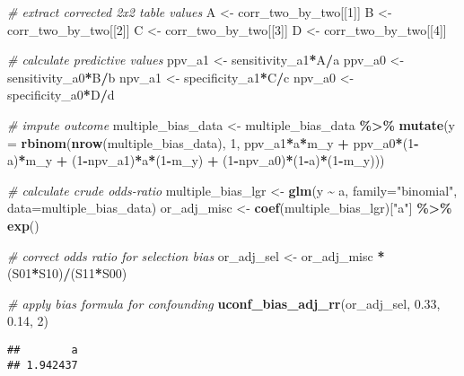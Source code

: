 \documentclass[
]{book}
\newenvironment{Shaded}{\begin{snugshade}}{\end{snugshade}}
\newcommand{\AttributeTok}[1]{\textcolor[rgb]{0.13,0.29,0.53}{#1}}
\newcommand{\CommentTok}[1]{\textcolor[rgb]{0.56,0.35,0.01}{\textit{#1}}}
\newcommand{\DecValTok}[1]{\textcolor[rgb]{0.00,0.00,0.81}{#1}}
\newcommand{\FloatTok}[1]{\textcolor[rgb]{0.00,0.00,0.81}{#1}}
\newcommand{\FunctionTok}[1]{\textcolor[rgb]{0.13,0.29,0.53}{\textbf{#1}}}
\newcommand{\NormalTok}[1]{#1}
\newcommand{\OtherTok}[1]{\textcolor[rgb]{0.56,0.35,0.01}{#1}}
\newcommand{\SpecialCharTok}[1]{\textcolor[rgb]{0.81,0.36,0.00}{\textbf{#1}}}
\newcommand{\StringTok}[1]{\textcolor[rgb]{0.31,0.60,0.02}{#1}}
\begin{document}
\begin{Shaded}
\begin{Highlighting}[]
\CommentTok{\# extract corrected 2x2 table values}
\NormalTok{A }\OtherTok{\textless{}{-}}\NormalTok{ corr\_two\_by\_two[[}\DecValTok{1}\NormalTok{]]}
\NormalTok{B }\OtherTok{\textless{}{-}}\NormalTok{ corr\_two\_by\_two[[}\DecValTok{2}\NormalTok{]]}
\NormalTok{C }\OtherTok{\textless{}{-}}\NormalTok{ corr\_two\_by\_two[[}\DecValTok{3}\NormalTok{]]}
\NormalTok{D }\OtherTok{\textless{}{-}}\NormalTok{ corr\_two\_by\_two[[}\DecValTok{4}\NormalTok{]]}

\CommentTok{\# calculate predictive values}
\NormalTok{ppv\_a1 }\OtherTok{\textless{}{-}}\NormalTok{ sensitivity\_a1}\SpecialCharTok{*}\NormalTok{A}\SpecialCharTok{/}\NormalTok{a}
\NormalTok{ppv\_a0 }\OtherTok{\textless{}{-}}\NormalTok{ sensitivity\_a0}\SpecialCharTok{*}\NormalTok{B}\SpecialCharTok{/}\NormalTok{b}
\NormalTok{npv\_a1 }\OtherTok{\textless{}{-}}\NormalTok{ specificity\_a1}\SpecialCharTok{*}\NormalTok{C}\SpecialCharTok{/}\NormalTok{c}
\NormalTok{npv\_a0 }\OtherTok{\textless{}{-}}\NormalTok{ specificity\_a0}\SpecialCharTok{*}\NormalTok{D}\SpecialCharTok{/}\NormalTok{d}

\CommentTok{\# impute outcome}
\NormalTok{multiple\_bias\_data }\OtherTok{\textless{}{-}}\NormalTok{ multiple\_bias\_data }\SpecialCharTok{\%\textgreater{}\%} \FunctionTok{mutate}\NormalTok{(}\AttributeTok{y =} \FunctionTok{rbinom}\NormalTok{(}\FunctionTok{nrow}\NormalTok{(multiple\_bias\_data), }\DecValTok{1}\NormalTok{, ppv\_a1}\SpecialCharTok{*}\NormalTok{a}\SpecialCharTok{*}\NormalTok{m\_y }\SpecialCharTok{+}\NormalTok{ ppv\_a0}\SpecialCharTok{*}\NormalTok{(}\DecValTok{1}\SpecialCharTok{{-}}\NormalTok{a)}\SpecialCharTok{*}\NormalTok{m\_y }\SpecialCharTok{+}\NormalTok{ (}\DecValTok{1}\SpecialCharTok{{-}}\NormalTok{npv\_a1)}\SpecialCharTok{*}\NormalTok{a}\SpecialCharTok{*}\NormalTok{(}\DecValTok{1}\SpecialCharTok{{-}}\NormalTok{m\_y) }\SpecialCharTok{+}\NormalTok{ (}\DecValTok{1}\SpecialCharTok{{-}}\NormalTok{npv\_a0)}\SpecialCharTok{*}\NormalTok{(}\DecValTok{1}\SpecialCharTok{{-}}\NormalTok{a)}\SpecialCharTok{*}\NormalTok{(}\DecValTok{1}\SpecialCharTok{{-}}\NormalTok{m\_y)))}

\CommentTok{\# calculate crude odds{-}ratio}
\NormalTok{multiple\_bias\_lgr }\OtherTok{\textless{}{-}} \FunctionTok{glm}\NormalTok{(y }\SpecialCharTok{\textasciitilde{}}\NormalTok{ a,  }\AttributeTok{family=}\StringTok{"binomial"}\NormalTok{, }\AttributeTok{data=}\NormalTok{multiple\_bias\_data) }
\NormalTok{or\_adj\_misc }\OtherTok{\textless{}{-}} \FunctionTok{coef}\NormalTok{(multiple\_bias\_lgr)[}\StringTok{"a"}\NormalTok{] }\SpecialCharTok{\%\textgreater{}\%} \FunctionTok{exp}\NormalTok{()}
  
\CommentTok{\# correct odds ratio for selection bias}
\NormalTok{or\_adj\_sel }\OtherTok{\textless{}{-}}\NormalTok{ or\_adj\_misc }\SpecialCharTok{*}\NormalTok{ (S01}\SpecialCharTok{*}\NormalTok{S10)}\SpecialCharTok{/}\NormalTok{(S11}\SpecialCharTok{*}\NormalTok{S00)}

\CommentTok{\# apply bias formula for confounding}
\FunctionTok{uconf\_bias\_adj\_rr}\NormalTok{(or\_adj\_sel, }\FloatTok{0.33}\NormalTok{, }\FloatTok{0.14}\NormalTok{, }\DecValTok{2}\NormalTok{)}
\end{Highlighting}
\end{Shaded}

\begin{verbatim}
##        a 
## 1.942437
\end{verbatim}

  
\end{document}
